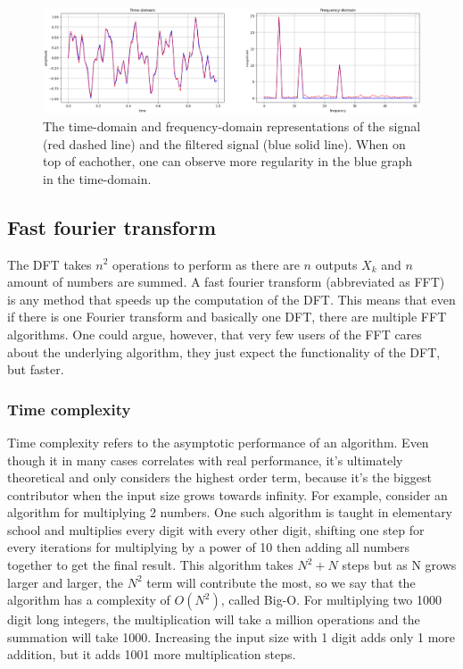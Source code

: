 \begin{figure}[ht]
    \centering
    \includegraphics[width=\textwidth]{./images/filtered_signal.png}
    \caption{The time-domain and frequency-domain representations of the signal (red dashed line) and the filtered signal (blue solid line). When on top of eachother, one can observe more regularity in the blue graph in the time-domain.\label{fig:DFT-IDFT}}
\end{figure}

\subsection{Fast fourier transform}
The DFT takes $n^2$ operations to perform as there are $n$ outputs $X_k$ and $n$ amount of numbers are summed. A fast fourier transform (abbreviated as FFT) is any method that speeds up the computation of the DFT. This means that even if there is one Fourier transform and basically one DFT, there are multiple FFT algorithms. One could argue, however, that very few users of the FFT cares about the underlying algorithm, they just expect the functionality of the DFT, but faster. 

\subsubsection{Time complexity}
Time complexity refers to the asymptotic performance of an algorithm. Even though it in many cases correlates with real performance, it's ultimately theoretical and only considers the highest order term, because it's the biggest contributor when the input size grows towards infinity. For example, consider an algorithm for multiplying 2 numbers. One such algorithm is taught in elementary school and multiplies every digit with every other digit, shifting one step for every iterations for multiplying by a power of 10 then adding all numbers together to get the final result. This algorithm takes $N^2+N$ steps but as N grows larger and larger, the $N^2$ term will contribute the most, so we say that the algorithm has a complexity of $O(N^2)$, called Big-O. For multiplying two 1000 digit long integers, the multiplication will take a million operations and the summation will take 1000. Increasing the input size with 1 digit adds only 1 more addition, but it adds 1001 more multiplication steps.

